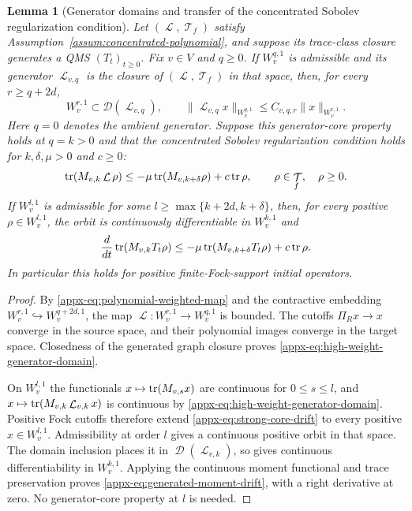 \documentclass[11pt]{article}
\theoremstyle{myplain}
\newtheorem{lem}[lem]{Lemma}
\theoremstyle{mydefinition}
\theoremstyle{remark}
\DeclareMathOperator{\cD}{\mathcal{D}}
\DeclareMathOperator{\cL}{\mathcal{L}}
\DeclareMathOperator{\cT}{\mathcal{T}}
\DeclareMathOperator{\1}{\mathds{1}}
\newcommand{\tr}[1][]{\operatorname{tr}%
  \ifx#1\empty \else \left[ #1 \right] \fi}
\begin{document}
    \begin{lem}[Generator domains and transfer of the concentrated Sobolev regularization condition]\label{lem:core-drift-transfer}
        Let $(\cL,\cT_f)$ satisfy Assumption~\ref{assum:concentrated-polynomial}, and suppose its trace-class closure generates a QMS $(T_t)_{t\geq0}$. Fix $v\in V$ and $q\geq0$. If $W_v^{q,1}$ is admissible and its generator $\cL_{v,q}$ is the closure of $(\cL,\cT_f)$ in that space, then, for every $r\geq q+2d$,
        \begin{equation}\label{appx-eq:high-weight-generator-domain}
            W_v^{r,1}\subset\mathcal D(\cL_{v,q}),\qquad
            \|\cL_{v,q}x\|_{W_v^{q,1}}\leq C_{v,q,r}\|x\|_{W_v^{r,1}}.
        \end{equation}
        Here $q=0$ denotes the ambient generator. Suppose this generator-core property holds at $q=k>0$ and that the concentrated Sobolev regularization condition holds for $k,\delta,\mu>0$ and $c\geq0$:
        \begin{equation}\label{appx-eq:strong-core-drift}
            \tr(M_{v,k}\cL\rho)
            \leq-\mu\tr(M_{v,k+\delta}\rho)+c\tr\rho,
            \qquad \rho\in\cT_f,\quad\rho\geq0.
        \end{equation}
        If $W_v^{l,1}$ is admissible for some $l\geq\max\{k+2d,k+\delta\}$, then, for every positive $\rho\in W_v^{l,1}$, the orbit is continuously differentiable in $W_v^{k,1}$ and
        \begin{equation}\label{appx-eq:generated-moment-drift}
            \frac{d}{dt}\tr(M_{v,k}T_t\rho)
            \leq-\mu\tr(M_{v,k+\delta}T_t\rho)+c\tr\rho.
        \end{equation}
        In particular this holds for positive finite-Fock-support initial operators.
    \end{lem}
    \begin{proof}
        By \eqref{appx-eq:polynomial-weighted-map} and the contractive embedding $W_v^{r,1} \hookrightarrow W_v^{q+2d,1}$, the map $\cL : W_v^{r,1} \to W_v^{q,1}$ is bounded. The cutoffs $\Pi_R x \to x$ converge in the source space, and their polynomial images converge in the target space. Closedness of the generated graph closure proves \eqref{appx-eq:high-weight-generator-domain}.

        On $W_v^{l,1}$ the functionals $x\mapsto\tr(M_{v,s}x)$ are continuous for $0\leq s\leq l$, and $x\mapsto\tr(M_{v,k}\cL_{v,k}x)$ is continuous by \eqref{appx-eq:high-weight-generator-domain}. Positive Fock cutoffs therefore extend \eqref{appx-eq:strong-core-drift} to every positive $x\in W_v^{l,1}$. Admissibility at order $l$ gives a continuous positive orbit in that space. The domain inclusion places it in $\cD(\cL_{v,k})$, so \cite[Lem.~II.1.3(ii)]{Engel.2000} gives continuous differentiability in $W_v^{k,1}$. Applying the continuous moment functional and trace preservation proves \eqref{appx-eq:generated-moment-drift}, with a right derivative at zero. No generator-core property at $l$ is needed.
    \end{proof}
    
\end{document}
